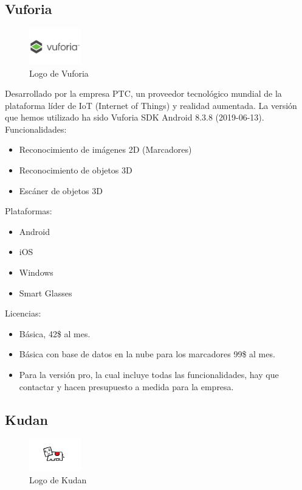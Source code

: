\subsection{Vuforia}
\begin{figure}[H]
    \centering
    \includegraphics[width=0.2\textwidth]{Images/Vuforia.jpeg}
    \caption{Logo de Vuforia}
    \label{fig:Vuforia}
\end{figure}
Desarrollado por la empresa PTC, un proveedor tecnológico mundial de la plataforma líder de IoT (Internet of Things) y realidad aumentada. La versión que hemos utilizado ha sido Vuforia SDK Android 8.3.8 (2019-06-13).\cite{Vuforia}
Funcionalidades:
\begin{itemize}
\item Reconocimiento de imágenes 2D (Marcadores)
\item Reconocimiento de objetos 3D
\item Escáner de objetos 3D
\end{itemize}
Plataformas:
\begin{itemize}
\item Android
\item iOS
\item Windows
\item Smart Glasses
\end{itemize}
Licencias:
\begin{itemize}
\item Básica, 42\$ al mes.
\item Básica con base de datos en la nube para los marcadores 99\$ al mes.
\item Para la versión pro, la cual incluye todas las funcionalidades, hay que contactar y hacen presupuesto a medida para la empresa.
\end{itemize}

\subsection{Kudan}
 \begin{figure}[H]
    \centering
    \includegraphics[width=0.2\textwidth]{Images/Kudan_Logo.png}
    \caption{Logo de Kudan}
    \label{fig:Kudan}
\end{figure}

